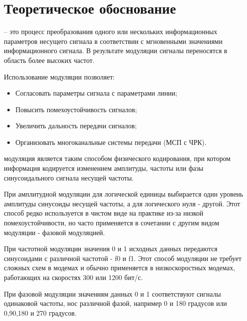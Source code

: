 \documentclass[a4paper,12pt]{article}
\begin{document}
\section{Теоретическое обоснование}

{} -- это процесс преобразования одного или нескольких информационных параметров несущего сигнала в соответствии с мгновенными значениями информационного сигнала. В результате модуляции сигналы переносятся в область более высоких частот.

Использование модуляции позволяет:
\begin{itemize}
\item Согласовать параметры сигнала с параметрами линии;
\item Повысить помехоустойчивость сигналов;
\item Увеличить дальность передачи сигналов;
\item Организовать многоканальные системы передачи (МСП с ЧРК).
\end{itemize}

{ модуляция} является таким способом физического кодирования, при котором информация кодируется изменением амплитуды, частоты или фазы синусоидального сигнала несущей частоты.

При амплитудной модуляции для логической единицы выбирается один уровень амплитуды синусоиды несущей частоты, а для логического нуля - другой. Этот способ редко используется в чистом виде на практике из-за низкой помехоустойчивости, но часто применяется в сочетании с другим видом модуляции - фазовой модуляцией.

При частотной модуляции значения 0 и 1 исходных данных передаются синусоидами с различной частотой - f0 и f1. Этот способ модуляции не требует сложных схем в модемах и обычно применяется в низкоскоростных модемах, работающих на скоростях 300 или 1200 бит/с.

При фазовой модуляции значениям данных 0 и 1 соответствуют сигналы одинаковой частоты, нос различной фазой, например 0 и 180 градусов или 0,90,180 и 270 градусов.

\newpage
\end{document}
